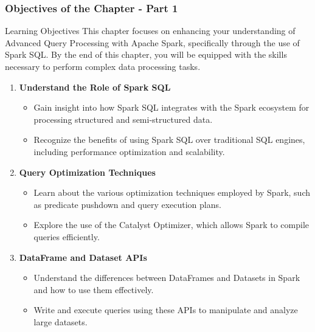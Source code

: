 \documentclass[aspectratio=169]{beamer}
\begin{document}
\begin{frame}[fragile]
    \frametitle{Objectives of the Chapter - Part 1}
    \begin{block}{Learning Objectives}
        This chapter focuses on enhancing your understanding of Advanced Query Processing with Apache Spark, specifically through the use of Spark SQL. By the end of this chapter, you will be equipped with the skills necessary to perform complex data processing tasks.
    \end{block}

    \begin{enumerate}
        \item \textbf{Understand the Role of Spark SQL}
        \begin{itemize}
            \item Gain insight into how Spark SQL integrates with the Spark ecosystem for processing structured and semi-structured data.
            \item Recognize the benefits of using Spark SQL over traditional SQL engines, including performance optimization and scalability.
        \end{itemize}

        \item \textbf{Query Optimization Techniques}
        \begin{itemize}
            \item Learn about the various optimization techniques employed by Spark, such as predicate pushdown and query execution plans.
            \item Explore the use of the Catalyst Optimizer, which allows Spark to compile queries efficiently.
        \end{itemize}

        \item \textbf{DataFrame and Dataset APIs}
        \begin{itemize}
            \item Understand the differences between DataFrames and Datasets in Spark and how to use them effectively.
            \item Write and execute queries using these APIs to manipulate and analyze large datasets.
        \end{itemize}
    \end{enumerate}
\end{frame}
\end{document}
